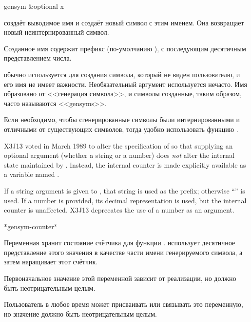 \begin{defun}[Функция]
gensym &optional x

 создаёт выводимое имя и создаёт новый символ с этим именем.
Она возвращает новый неинтернированный символ.

Созданное имя содержит префикс (по-умолчанию ), с последующим десятичным
представлением числа.

 обычно используется для создания символа, который не виден
пользователю, и его имя не имеет важности.
Необязательный аргумент используется нечасто. Имя образовано от <<генерация
символа>>, и символы созданные, таким образом, часто называются <<gensyms>>.

Если необходимо, чтобы сгенерированные символы были интернированными и отличными
от существующих символов, тогда удобно использовать функцию .

\begin{newer}
X3J13 voted in March 1989 
to alter the specification of  so that supplying an
optional argument (whether a string or a number) does \emph{not} alter
the internal state maintained by .
Instead, the internal
counter is made explicitly available as a variable named .

If a string argument is given to , that string is used as the prefix;
otherwise ``'' is used.  If a number is provided, its decimal
representation is used, but the internal counter is unaffected.
X3J13 deprecates the use of a number as an argument.
\end{newer}
\end{defun}

\begin{defun}[Переменная]
*gensym-counter*

Переменная хранит состояние счётчика для функции . 
использует десятичное представление этого значения в качестве части имени
генерируемого символа, а затем наращивает этот счётчик.

Первоначальное значение этой переменной зависит от реализации, но должно быть
неотрицательным целым.

Пользователь в любое время может присваивать или связывать это переменную, но
значение должно быть неотрицательным целым.
\end{defun}

